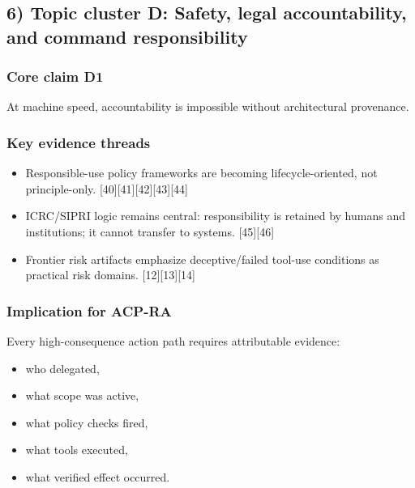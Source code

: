 \documentclass[
]{article}
\providecommand{\tightlist}{%
  \setlength{\itemsep}{0pt}\setlength{\parskip}{0pt}}
\begin{document}
\hypertarget{topic-cluster-d-safety-legal-accountability-and-command-responsibility}{%
\subsection{6) Topic cluster D: Safety, legal accountability, and
command
responsibility}\label{topic-cluster-d-safety-legal-accountability-and-command-responsibility}}

\hypertarget{core-claim-d1}{%
\subsubsection{Core claim D1}\label{core-claim-d1}}

At machine speed, accountability is impossible without architectural
provenance.

\hypertarget{key-evidence-threads-3}{%
\subsubsection{Key evidence threads}\label{key-evidence-threads-3}}

\begin{itemize}
\tightlist
\item
  Responsible-use policy frameworks are becoming lifecycle-oriented, not
  principle-only. {[}40{]}{[}41{]}{[}42{]}{[}43{]}{[}44{]}
\item
  ICRC/SIPRI logic remains central: responsibility is retained by humans
  and institutions; it cannot transfer to systems. {[}45{]}{[}46{]}
\item
  Frontier risk artifacts emphasize deceptive/failed tool-use conditions
  as practical risk domains. {[}12{]}{[}13{]}{[}14{]}
\end{itemize}

\hypertarget{implication-for-acp-ra-3}{%
\subsubsection{Implication for ACP-RA}\label{implication-for-acp-ra-3}}

Every high-consequence action path requires attributable evidence:

\begin{itemize}
\tightlist
\item
  who delegated,
\item
  what scope was active,
\item
  what policy checks fired,
\item
  what tools executed,
\item
  what verified effect occurred.
\end{itemize}
\end{document}
